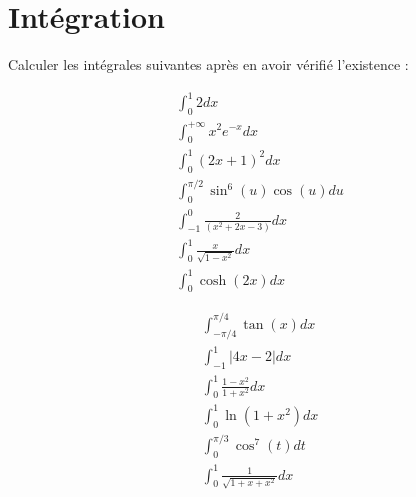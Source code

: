 \chapter{Intégration}
\renewcommand{\textbf}[1]{\begingroup\bfseries\mathversion{bold}#1\endgroup} %
\renewcommand{\ExerciseName}{Exercice}
\renewcommand{\AnswerName}{Solution exercice}
\renewcommand{\QuestionBefore}{3mm}


\renewcommand{\labelitemi}{$\bullet$}
\renewcommand{\ExerciseHeader}{%
	\par \noindent
	\textbf{\large \ExerciseName ~ \ExerciseHeaderNB  \ExerciseHeaderTitle\ExerciseHeaderOrigin}%
	\par\nopagebreak\medskip
	}

\begin{Exercise}[title={Intégrales simples}]
	Calculer les intégrales suivantes après en avoir vérifié l’existence :
	
	\noindent
	\begin{minipage}{0.5\linewidth}
		\begin{align}
		\int_{0}^{1} 2dx \\
		\int_{0}^{+\infty} x^2 e^{-x} dx \\
		\int_{0}^{1} (2x+1)^2 dx \\
		\int_{0}^{\pi/2} \sin^6(u)\cos(u) du \\
		\int_{-1}^{0} \frac{2}{(x^2 + 2x -3)} dx \\
		\int_{0}^{1} \frac{x}{\sqrt{1-x^2}} dx \\
		\int_{0}^{1} \cosh(2x)dx
		\end{align}	
	\end{minipage}
	\begin{minipage}{0.5\linewidth}
		\begin{align}
		\int_{-\pi/4}^{\pi/4}\tan(x)dx \\
		\int_{-1}^{1} |4x -2|dx \\
		\int_{0}^{1} \frac{1 - x^2}{1 + x^2} dx \\
		\int_{0}^{1} \ln(1 +x^2) dx \\
		\int_{0}^{\pi/3} \cos^7(t)dt \\
		\int_{0}^{1} \frac{1}{\sqrt{1+x+x^2}}dx
		\end{align}
	\end{minipage}
\end{Exercise}

